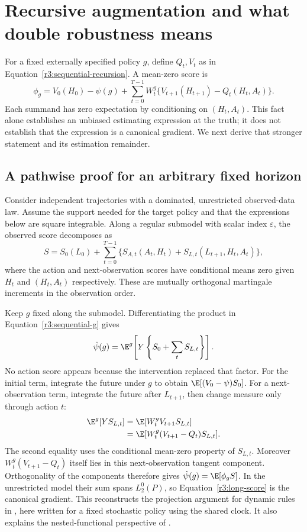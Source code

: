 \section{Recursive augmentation and what double robustness means}
\label{r3:long-dr}
For a fixed externally specified policy $g$, define $Q_t,V_t$ as in
Equation~\eqref{r3:sequential-recursion}. A mean-zero score is
\begin{equation}
 \phi_g=V_0(H_0)-\psi(g)+
      \sum_{t=0}^{T-1}W_t^g
       \{V_{t+1}(H_{t+1})-Q_t(H_t,A_t)\}.
 \label{r3:long-score}
\end{equation}
Each summand has zero expectation by conditioning on $(H_t,A_t)$.
This fact alone establishes an unbiased estimating expression at the
truth; it does not establish that the expression is a canonical gradient.
We next derive that stronger statement and its estimation remainder.

\subsection{A pathwise proof for an arbitrary fixed horizon}
\label{r3:long-gradient-proof}
Consider independent trajectories with a dominated, unrestricted
observed-data law. Assume the support needed for the target policy and
that the expressions below are square integrable. Along a regular
submodel with scalar index $\varepsilon$, the observed score decomposes as
\[
 S=S_0(L_0)+\sum_{t=0}^{T-1}
       \{S_{A,t}(A_t,H_t)+S_{L,t}(L_{t+1},H_t,A_t)\},
\]
where the action and next-observation scores have conditional means zero
given $H_t$ and $(H_t,A_t)$ respectively. These are mutually orthogonal
martingale increments in the observation order.

Keep $g$ fixed along the submodel. Differentiating the product in
Equation~\eqref{r3:sequential-g} gives
\[
 \dot\psi(g)=\E^g\!\left[Y\left\{S_0+\sum_t S_{L,t}\right\}\right].
\]
No action score appears because the intervention replaced that factor.
For the initial term, integrate the future under $g$ to obtain
$\E[(V_0-\psi)S_0]$. For a next-observation term, integrate the future
after $L_{t+1}$, then change measure only through action $t$:
\begin{align*}
 \E^g[YS_{L,t}]&=\E[W_t^gV_{t+1}S_{L,t}]\\
 &=\E[W_t^g(V_{t+1}-Q_t)S_{L,t}].
\end{align*}
The second equality uses the conditional mean-zero property of
$S_{L,t}$. Moreover $W_t^g(V_{t+1}-Q_t)$ itself lies in this
next-observation tangent component. Orthogonality of the components
therefore gives $\dot\psi(g)=\E[\phi_g S]$. In the unrestricted
model their sum spans $L_2^0(P)$, so Equation~\eqref{r3:long-score}
is the canonical gradient. This reconstructs the projection argument
for dynamic rules in \citet[Chapter 4, Section 4.4.1]{targeted2018},
here written for a fixed stochastic policy using the shared clock.
It also explains the nested-functional perspective of \citet{nested2022}.

